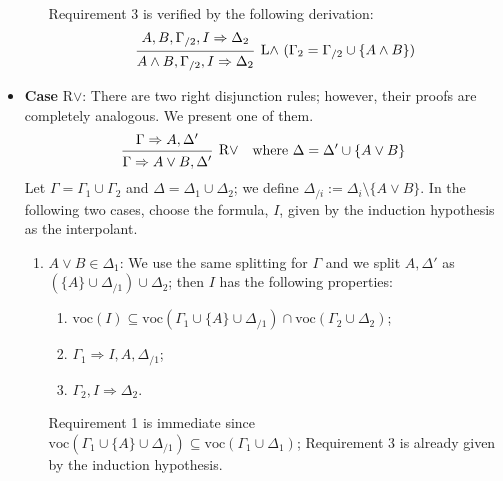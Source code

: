 \documentclass[a4paper]{article}
\newcommand{\voc}{\mathrm{voc}}
\begin{document}
\begin{itemize}
\begin{enumerate}
    Requirement 3 is verified by the following derivation:
    \[
      \begin{prooftree}
        \hypo{A,B,\Gamma_{/2},I \Rightarrow \Delta_2}
        \infer1[L$\wedge$ ($\Gamma_2 = \Gamma_{/2} \cup \{A \wedge B\}$)]{A \wedge B, \Gamma_{/2}, I \Rightarrow \Delta_2}
      \end{prooftree}
    \]
  \end{enumerate}
\item \textbf{Case} R$\vee$:
  There are two right disjunction rules; however, their proofs are completely analogous.
  We present one of them.
  \begin{align*}
    \begin{prooftree}
      \hypo{\Gamma \Rightarrow A, \Delta'}
      \infer1[R$\vee$]{\Gamma \Rightarrow A \vee B, \Delta'}
    \end{prooftree}
    && \text{where $\Delta = \Delta' \cup \{A \vee B\}$}
  \end{align*}
  Let $\Gamma = \Gamma_1 \cup \Gamma_2$ and $\Delta = \Delta_1 \cup \Delta_2$; we define $\Delta_{/i} := \Delta_i \setminus \{A \vee B\}$.
  In the following two cases, choose the formula, $I$, given by the induction hypothesis as the interpolant.
  \begin{enumerate}
  \item $A \vee B \in \Delta_1$: We use the same splitting for $\Gamma$ and we split $A,\Delta'$ as $(\{A\} \cup \Delta_{/1}) \cup \Delta_2$; then $I$ has the following properties:
    \begin{enumerate}
    \item $\voc(I) \subseteq \voc(\Gamma_1 \cup \{A\} \cup \Delta_{/1}) \cap \voc(\Gamma_2 \cup \Delta_2)$;
    \item $\Gamma_1 \Rightarrow I, A, \Delta_{/1}$;
    \item $\Gamma_2,I \Rightarrow \Delta_2$.
    \end{enumerate}
    Requirement 1 is immediate since $\voc(\Gamma_1 \cup \{A\} \cup \Delta_{/1}) \subseteq \voc(\Gamma_1 \cup \Delta_1)$; Requirement 3 is already given by the induction hypothesis.


\end{enumerate}
\end{itemize}
\end{document}
